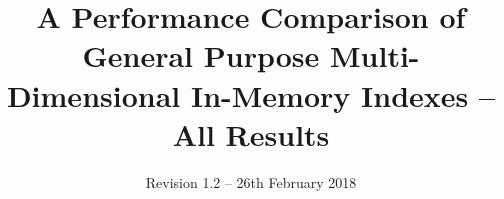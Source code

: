 \documentclass{vldb}
\begin{document}
\title{A Performance Comparison of General Purpose Multi-Dimensional In-Memory Indexes -- All Results}
\subtitle{Revision 1.2 -- 26th February 2018}


%
%
%
%
%

%
\end{document}
